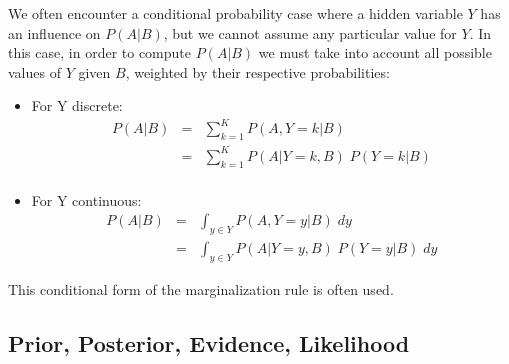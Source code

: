 \begin{itemize}
We often encounter a conditional probability case where a hidden variable $Y$ has an influence on $P(A|B)$, but we cannot assume any particular value for $Y$. In this case, in order to compute $P(A|B)$ we must take into account all possible values of $Y$ given $B$, weighted by their respective probabilities:
\begin{itemize}
\item For Y discrete:
\begin{eqnarray}
P(A|B) & = & \sum_{k=1}^K P(A,Y=k|B) \nonumber \\
       & = & \sum_{k=1}^K P(A|Y=k,B) \; P(Y=k|B) \label{eq:margcond1} \\
\end{eqnarray}
\item For Y continuous:
\begin{eqnarray}
P(A|B) & = & \int_{y \in Y} P(A,Y=y|B) \; dy \nonumber \\
       & = & \int_{y \in Y} P(A|Y=y,B) \; P(Y=y|B) \; dy
\label{eq:margcond2}
\end{eqnarray}
\end{itemize}

This conditional form of the marginalization rule is often used.

\end{itemize}

\subsection{Prior, Posterior, Evidence, Likelihood}

